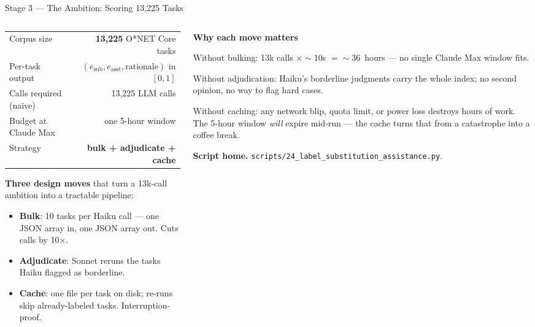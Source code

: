 \documentclass[10pt,english,aspectratio=169]{beamer}
\begin{document}
\begin{frame}{Stage 3 --- The Ambition: Scoring 13{,}225 Tasks}
\begin{columns}[T]
\begin{column}{0.5\textwidth}
\scriptsize
\begin{tabular}{lr}
\toprule
Corpus size & \textbf{13{,}225} O*NET Core tasks \\
Per-task output & $(e_{\text{sub}}, e_{\text{asst}}, \text{rationale})$ in $[0,1]$ \\
Calls required (na\"ive) & 13{,}225 LLM calls \\
Budget at Claude Max & one 5-hour window \\
Strategy & \textbf{bulk + adjudicate + cache} \\
\bottomrule
\end{tabular}

\vspace{0.25cm}
\textbf{Three design moves} that turn a 13k-call ambition into a tractable pipeline:
\begin{itemize}\scriptsize
  \item \textbf{Bulk}: 10 tasks per Haiku call --- one JSON array in, one JSON array out. Cuts calls by 10$\times$.
  \item \textbf{Adjudicate}: Sonnet reruns the tasks Haiku flagged as borderline.
  \item \textbf{Cache}: one file per task on disk; re-runs skip already-labeled tasks. Interruption-proof.
\end{itemize}
\end{column}
\begin{column}{0.48\textwidth}
\textbf{Why each move matters}
\begin{tcolorbox}[colback=gray!5,colframe=gray!40]\scriptsize
Without bulking: 13k calls $\times \sim 10$s $= \sim$36~hours --- no single Claude Max window fits.

\vspace{0.1cm}
Without adjudication: Haiku's borderline judgments carry the whole index; no second opinion, no way to flag hard cases.

\vspace{0.1cm}
Without caching: any network blip, quota limit, or power loss destroys hours of work. The 5-hour window \emph{will} expire mid-run --- the cache turns that from a catastrophe into a coffee break.
\end{tcolorbox}
\vspace{0.1cm}
\textbf{Script home.} \texttt{scripts/24\_label\_substitution\_assistance.py}.
\end{column}
\end{columns}
\end{frame}
\end{document}
